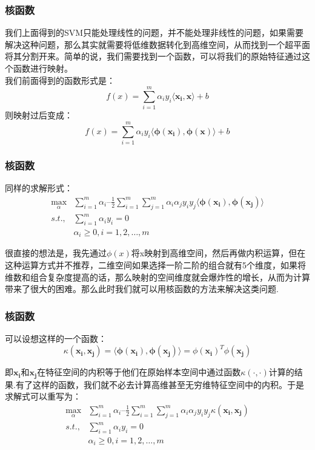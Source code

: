 \begin{frame}

\frametitle{核函数}

    我们上面得到的SVM只能处理线性的问题，并不能处理非线性的问题，如果需要解决这种问题，那么其实就需要将低维数据转化到高维空间，从而找到一个超平面将其分割开来。简单的说，我们需要找到一个函数，可以将我们的原始特征通过这个函数进行映射。\\
    我们前面得到的函数形式是：
 \[
 f(x)= \sum_{i=1}^m\alpha_i y_i \langle\boldsymbol{x_i, x}\rangle + b
 \]
 则映射过后变成：  
  \[
 f(x)= \sum_{i=1}^m\alpha_i y_i \langle\boldsymbol{\phi(x_i),\phi(x)}\rangle + b
 \]

\end{frame}


\begin{frame}

\frametitle{核函数}

同样的求解形式：
\begin{align*}
 \max_\alpha &\sum_{i=1}^m\alpha_i – \frac{1}{2}\sum_{i=1}^m\sum_{j=1}^m\alpha_i\alpha_jy_iy_j\langle\boldsymbol{\phi(x_i)},\boldsymbol{\phi(x_j)}\rangle \\ 
 s.t.,&\sum_{i=1}^m\alpha_iy_i = 0 \\
  &\alpha_i\geq 0, i=1,2,\ldots,m
 \end{align*}

 很直接的想法是，我先通过$\phi(x)$将x映射到高维空间，然后再做内积运算，但在这种运算方式并不推荐，二维空间如果选择一阶二阶的组合就有5个维度，如果将维数和组合复杂度提高的话，那么映射的空间维度就会爆炸性的增长，从而为计算带来了很大的困难。那么此时我们就可以用核函数的方法来解决这类问题.
\end{frame}


\begin{frame}

\frametitle{核函数}

可以设想这样的一个函数：
\[
\kappa(\boldsymbol{x_i,x_j})=\langle\boldsymbol{\phi(x_i),\phi(x_j)}\rangle = \phi(\boldsymbol{x_i})^T\phi(\boldsymbol{x_j})
\]

即$\boldsymbol{x_i}$和$\boldsymbol{x_j}$在特征空间的内积等于他们在原始样本空间中通过函数$\kappa(\cdot,\cdot)$计算的结果.有了这样的函数，我们就不必去计算高维甚至无穷维特征空间中的内积。于是求解式可以重写为：
\begin{align*}
 \max_\alpha &\sum_{i=1}^m\alpha_i – \frac{1}{2}\sum_{i=1}^m\sum_{j=1}^m\alpha_i\alpha_jy_iy_j\kappa(\boldsymbol{x_i,x_j}) \\ 
 s.t.,&\sum_{i=1}^m\alpha_iy_i = 0 \\
  &\alpha_i\geq 0, i=1,2,\ldots,m
 \end{align*}
\end{frame}


